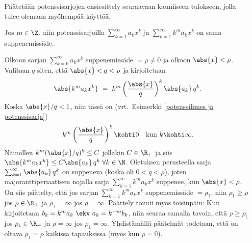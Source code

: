 Päätetään potenssisarjojen ensiesittely seuraavaan kauniiseen tulokseen, jolla tulee olemaan 
myöhempää käyttöä.
\begin{Lause} \label{potenssisarjan skaalaus} Jos $m \in \Z$, niin potenssisarjoilla 
$\sum_{k=1}^\infty a_k x^k$ ja $\sum_{k=1}^\infty k^m a_k x^k$ on sama suppenemissäde. 
\end{Lause}
\tod Olkoon sarjan $\sum_{k=0}^\infty a_k x^k$ suppenemissäde
$ = \rho \neq 0$ ja olkoon $\abs{x} < \rho$. Valitaan $q$ siten, että $\abs{x} < q < \rho$ ja 
kirjoitetaan
\[
\abs{k^m a_k x^k}\ =\ k^m \left(\dfrac{\abs{x}}{q}\right)^k \abs{a_k}\,q^k.
\]
Koska $\abs{x}/q < 1$, niin tässä on (vrt.\ Esimerkki \ref{potenssilimes ja potenssisarja})
\[ 
k^m \left(\dfrac{\abs{x}}{q}\right)^k \kohti 0 \quad \text{kun}\ k \kohti \infty. 
\]
Näinollen $k^m (\abs{x}/q)^k \le C$ jollakin $C \in \R_+$ ja siis 
$\abs{k^m a_k x^k} \le C \abs{a_k}\,q^k \ \forall k \in \N$. Oletuksen perusteella sarja 
$\sum_{k=1}^\infty \abs{a_k}\,q^k$ on suppeneva (koska oli $0 < q < \rho$), joten 
majoranttiperiaatteen nojalla sarja $\sum_{k=1}^\infty k^m a_k x^k$ suppenee, kun 
$\abs{x} < \rho$. On siis päätelty, että jos sarjan $\sum_{k=1}^\infty k^m a_k x^k$ 
suppenemissäde $= \rho_1$, niin $\rho_1 \ge \rho$ jos $\rho \in \R_+$ ja $\rho_1 = \infty$ 
jos $\rho = \infty$. Päättely toimii myös toisinpäin: Kun kirjoitetaan 
$b_k = k^m a_k\ \ekv\ a_k = k^{-m} b_k$, niin seuraa samalla tavoin, että $\rho \ge \rho_1$ jos
$\rho_1 \in \R_+$ ja $\rho = \infty$ jos $\rho_1 = \infty$. Yhdistämällä päätelmät todetaan, 
että on oltava $\rho_1 = \rho$ kaikissa tapauksissa (myös kun $\rho=0$). \loppu

